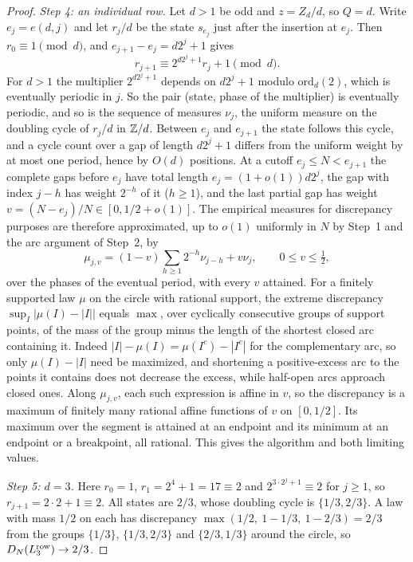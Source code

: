\documentclass[11pt]{article}
\begin{document}
\begin{proof}
\emph{Step 4: an individual row.} Let $d>1$ be odd and $z=Z_d/d$, so $Q=d$. Write $e_j=e(d,j)$ and let $r_j/d$ be the state $s_{e_j}$ just after the insertion at $e_j$. Then $r_0\equiv1\pmod d$, and $e_{j+1}-e_j=d2^j+1$ gives
\[
 r_{j+1}\equiv2^{d2^j+1}r_j+1\pmod d .
\]
For $d>1$ the multiplier $2^{d2^j+1}$ depends on $d2^j+1$ modulo $\mathrm{ord}_d(2)$, which is eventually periodic in $j$. So the pair (state, phase of the multiplier) is eventually periodic, and so is the sequence of measures $\nu_j$, the uniform measure on the doubling cycle of $r_j/d$ in $\mathbb Z/d$. Between $e_j$ and $e_{j+1}$ the state follows this cycle, and a cycle count over a gap of length $d2^j+1$ differs from the uniform weight by at most one period, hence by $O(d)$ positions. At a cutoff $e_j\le N<e_{j+1}$ the complete gaps before $e_j$ have total length $e_j=(1+o(1))d2^j$, the gap with index $j-h$ has weight $2^{-h}$ of it ($h\ge1$), and the last partial gap has weight $v=(N-e_j)/N\in[0,1/2+o(1)]$. The empirical measures for discrepancy purposes are therefore approximated, up to $o(1)$ uniformly in $N$ by Step~1 and the arc argument of Step~2, by
\[
 \mu_{j,v}=(1-v)\sum_{h\ge1}2^{-h}\nu_{j-h}+v\nu_j,\qquad 0\le v\le\tfrac12 ,
\]
over the phases of the eventual period, with every $v$ attained. For a finitely supported law $\mu$ on the circle with rational support, the extreme discrepancy $\sup_I|\mu(I)-|I||$ equals $\max$, over cyclically consecutive groups of support points, of the mass of the group minus the length of the shortest closed arc containing it. Indeed $|I|-\mu(I)=\mu(I^c)-|I^c|$ for the complementary arc, so only $\mu(I)-|I|$ need be maximized, and shortening a positive-excess arc to the points it contains does not decrease the excess, while half-open arcs approach closed ones. Along $\mu_{j,v}$, each such expression is affine in $v$, so the discrepancy is a maximum of finitely many rational affine functions of $v$ on $[0,1/2]$. Its maximum over the segment is attained at an endpoint and its minimum at an endpoint or a breakpoint, all rational. This gives the algorithm and both limiting values.

\emph{Step 5: $d=3$.} Here $r_0=1$, $r_1=2^4+1=17\equiv2$ and $2^{3\cdot2^j+1}\equiv2$ for $j\ge1$, so $r_{j+1}=2\cdot2+1\equiv2$. All states are $2/3$, whose doubling cycle is $\{1/3,2/3\}$. A law with mass $1/2$ on each has discrepancy $\max(1/2,\ 1-1/3,\ 1-2/3)=2/3$ from the groups $\{1/3\}$, $\{1/3,2/3\}$ and $\{2/3,1/3\}$ around the circle, so $D_N(L_3^{\rm row})\to2/3$.


\end{proof}
\end{document}
